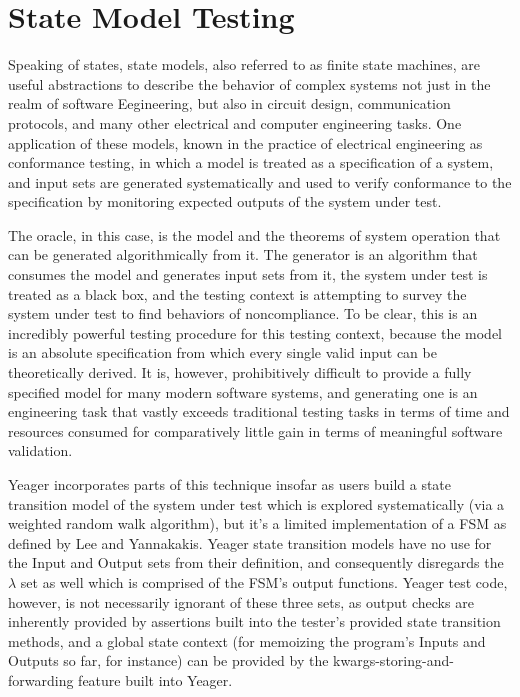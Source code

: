 \section{State Model Testing}
Speaking of states, state models, also referred to as finite state machines, are useful abstractions to describe the behavior of complex systems not just in the realm of software Eegineering, but also in circuit design, communication protocols, and many other electrical and computer engineering tasks. One application of these models, known in the practice of electrical engineering as conformance testing, in which a model is treated as a specification of a system, and input sets are generated systematically and used to verify conformance to the specification by monitoring expected outputs of the system under test.\citep{lee1996principles}

The oracle, in this case, is the model and the theorems of system operation that can be generated algorithmically from it. The generator is an algorithm that consumes the model and generates input sets from it, the system under test is treated as a black box, and the testing context is attempting to survey the system under test to find behaviors of noncompliance. To be clear, this is an incredibly powerful testing procedure for this testing context, because the model is an absolute specification from which every single valid input can be theoretically derived. It is, however, prohibitively difficult to provide a fully specified model for many modern software systems, and generating one is an engineering task that vastly exceeds traditional testing tasks in terms of time and resources consumed for comparatively little gain in terms of meaningful software validation.

Yeager incorporates parts of this technique insofar as users build a state transition model of the system under test which is explored systematically (via a weighted random walk algorithm), but it's a limited implementation of a FSM as defined by Lee and Yannakakis. Yeager state transition models have no use for the Input and Output sets from their definition, and consequently disregards the $\lambda$ set as well which is comprised of the FSM's output functions. Yeager test code, however, is not necessarily ignorant of these three sets, as output checks are inherently provided by assertions built into the tester's provided state transition methods, and a global state context (for memoizing the program's Inputs and Outputs so far, for instance) can be provided by the kwargs-storing-and-forwarding feature built into Yeager.

